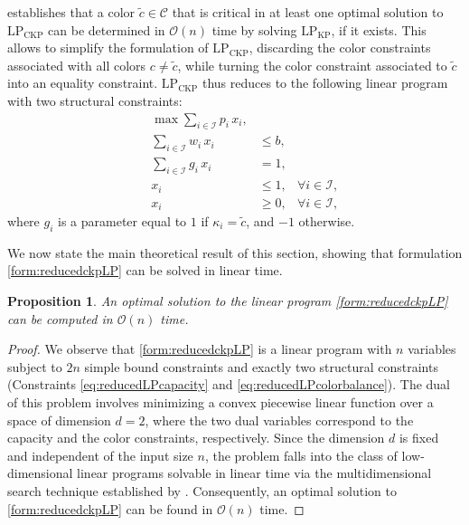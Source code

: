 \documentclass[preprint,11pt]{elsarticle}
\newcommand{\items}{\mathcal{I}}
\newcommand{\colors}{\mathcal{C}}
\newcommand{\profit}{p}
\newcommand{\weight}{w}
\newcommand{\capacity}{b}
\newcommand{\ckpLP}{\text{LP}_\text{CKP}}
\newcommand{\kpLP}{\text{LP}_\text{KP}}
\newtheorem{proposition}{Proposition}
\theoremstyle{definition}
\begin{document}
 establishes that a color $\tilde c \in \colors$ that is critical in at least one optimal solution to $\ckpLP$ can be determined in $\mathcal{O}(n)$ time by solving $\kpLP$, if it exists. This allows to simplify the formulation of $\ckpLP$, discarding the color constraints associated with all colors $c \neq \tilde c$, while turning the color constraint associated to $\tilde c$ into an equality constraint. $\ckpLP$ thus reduces to the following linear program with two structural constraints:
\begin{subequations} \label{form:reducedckpLP}
\begin{align}
     &  &\max  \sum_{i \in \items} \profit_i \, x_i, \\
     &    & \sum_{i \in \items} \weight_i \, x_i        & \leq \capacity,\label{eq:reducedLPcapacity}\\
     && \sum_{i \in \items} g_i \, x_i  & = 1,  \label{eq:reducedLPcolorbalance}\\
     && x_i & \leq  1, & \forall i \in \items,  \\
     && x_i & \geq  0, & \forall i \in \items,
\end{align}
\end{subequations}
where $g_i$ is a parameter equal to $1$ if $\kappa_i = \tilde c$, and $-1$ otherwise.

\smallskip

We now state the main theoretical result of this section, showing that formulation \eqref{form:reducedckpLP} can be solved in linear time.
\begin{proposition}\label{thm:complexityckpLP}
    An optimal solution to the linear program \eqref{form:reducedckpLP} can be computed in $\mathcal{O}(n)$ time.
\end{proposition}

\begin{proof}
    We observe that \eqref{form:reducedckpLP} is a linear program with $n$ variables subject to $2n$ simple bound constraints and exactly two structural constraints (Constraints \eqref{eq:reducedLPcapacity} and \eqref{eq:reducedLPcolorbalance}).
    The dual of this problem involves minimizing a convex piecewise linear function over a space of dimension $d=2$, where the two dual variables correspond to the capacity and the color constraints, respectively.
    Since the dimension $d$ is fixed and independent of the input size $n$, the problem falls into the class of low-dimensional linear programs solvable in linear time via the multidimensional search technique established by \citet{Megiddo1984}.
    Consequently, an optimal solution to \eqref{form:reducedckpLP} can be found in $\mathcal{O}(n)$ time.
\end{proof}
\end{document}
